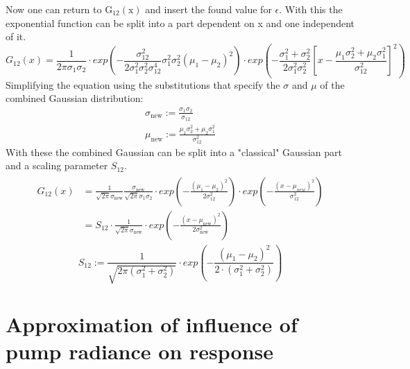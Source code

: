 \documentclass[twoside,openright,listof=numbered]{scrreprt}
\begin{document}
Now one can return to $\mathrm{G_{12}(x)}$ and insert the found value for $\epsilon$. With this the exponential function can be split into a part dependent on x and one independent of it.
\begin{equation*}
G_{12}(x) = \frac{1}{2\pi\sigma_1\sigma_2}\cdot exp\left(- \frac{\sigma_{12}^2}{2\sigma_1^2\sigma_2^2\sigma_{12}^4}\sigma_1^2\sigma_2^2\left(\mu_1-\mu_2\right)^2
\right) \cdot
exp\left(-\frac{\sigma_1^2+\sigma_2^2}{2\sigma_1^2\sigma_2^2} \left[x - \frac{\mu_1\sigma_2^2+\mu_2\sigma_1^2}{\sigma_{12}^2}\right]^2 \right)
\end{equation*}
Simplifying the equation using the substitutions that specify the $\sigma$ and $\mu$ of the combined Gaussian distribution:
\begin{gather*}
\sigma_\text{new} := \frac{\sigma_1\sigma_2}{\sigma_{12}}\\
\mu_\text{new} := \frac{\mu_1\sigma_2^2+ \mu_2\sigma_1^2}{\sigma_{12}^2}
\end{gather*}
With these the combined Gaussian can be split into a "classical" Gaussian part and a scaling parameter $S_{12}$.
\begin{gather*}
\begin{split}
G_{12}(x) & = \frac{1}{\sqrt{2\pi}\sigma_\text{new}}\frac{\sigma_\text{new}}{\sqrt{2\pi}\sigma_1\sigma_2}\cdot exp\left(- \frac{\left(\mu_1-\mu_2\right)^2}{2\sigma_{12}^2}\right) \cdot
exp\left(-\frac{\left(x-\mu_{new}\right)^2}{\sigma_{12}^2}\right)\\
& = S_{12} \cdot \frac{1}{\sqrt{2\pi}\sigma_\text{new}} \cdot exp\left(-\frac{\left(x-\mu_\text{new}\right)^2}{2\sigma_\text{new}^2}\right)
\end{split}
\end{gather*}
\begin{equation*}
S_{12} := \dfrac{1}{\sqrt{2\pi\left(\sigma_1^2+\sigma_2^2\right)}}\cdot exp\left(-\dfrac{\left(\mu_1 - \mu_2\right)^2}{2\cdot \left(\sigma_1^2+\sigma_2^2\right)}\right)
\end{equation*}

\section{Approximation of influence of pump radiance on response}\label{deriv:RadianceResponse}
\end{document}

